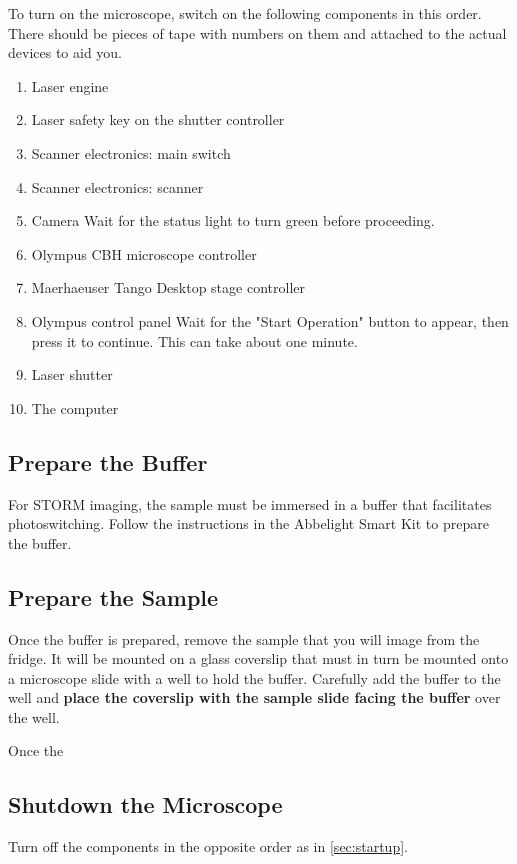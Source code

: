 \documentclass[10pt,a4paper,oneside]{book}
\begin{document}
To turn on the microscope, switch on the following components in this order. There should be pieces of tape with numbers on them and attached to the actual devices to aid you.

\begin{enumerate}
    \item Laser engine
    \item Laser safety key on the shutter controller
    \item Scanner electronics: main switch
    \item Scanner electronics: scanner
    \item Camera \newline Wait for the status light to turn green before proceeding.
    \item Olympus CBH microscope controller
    \item Maerhaeuser Tango Desktop stage controller
    \item Olympus control panel \newline Wait for the "Start Operation" button to appear, then press it to continue. This can take about one minute.
    \item Laser shutter
    \item The computer
\end{enumerate}

\subsection{Prepare the Buffer}

\newline

For STORM imaging, the sample must be immersed in a buffer that facilitates photoswitching. Follow the instructions in the Abbelight Smart Kit to prepare the buffer.

\subsection{Prepare the Sample}

Once the buffer is prepared, remove the sample that you will image from the fridge. It will be mounted on a glass coverslip that must in turn be mounted onto a microscope slide with a well to hold the buffer. Carefully add the buffer to the well and \textbf{place the coverslip with the sample slide facing the buffer} over the well.

Once the

\subsection{Shutdown the Microscope}

Turn off the components in the opposite order as in \autoref{sec:startup}.
\end{document}

